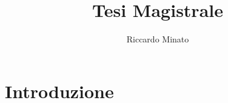 \documentclass{article}
\title{Tesi Magistrale}
\author{Riccardo Minato}
\date{}
\begin{document}
\maketitle
\tableofcontents
\printglossary




\section{Introduzione}






\end{document}
